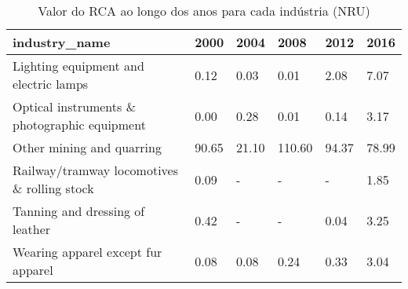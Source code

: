 \begin{table}
\centering
\caption{Valor do RCA ao longo dos anos para cada indústria (NRU)}
\begin{tabular}{p{6cm}p{1.5cm}p{1.5cm}p{1.5cm}p{1.5cm}p{1.5cm}}
\toprule
                               industry\_name &  2000 &  2004 &   2008 &  2012 &  2016 \\
\midrule
       Lighting equipment and electric lamps &  0.12 &  0.03 &   0.01 &  2.08 &  7.07 \\
Optical instruments \& photographic equipment &  0.00 &  0.28 &   0.01 &  0.14 &  3.17 \\
                   Other mining and quarring & 90.65 & 21.10 & 110.60 & 94.37 & 78.99 \\
 Railway/tramway locomotives \& rolling stock &  0.09 &     - &      - &     - &  1.85 \\
             Tanning and dressing of leather &  0.42 &     - &      - &  0.04 &  3.25 \\
          Wearing apparel except fur apparel &  0.08 &  0.08 &   0.24 &  0.33 &  3.04 \\
\bottomrule
\end{tabular}
\end{table}
